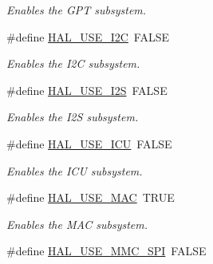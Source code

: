 \begin{DoxyCompactItemize}
\begin{DoxyCompactList}\small\item\em Enables the G\+P\+T subsystem. \end{DoxyCompactList}\item 
\hypertarget{group__HAL__CONF_gae5eb94efa72e401dc17a356b27f4e7e5}{\#define \hyperlink{group__HAL__CONF_gae5eb94efa72e401dc17a356b27f4e7e5}{H\+A\+L\+\_\+\+U\+S\+E\+\_\+\+I2\+C}~F\+A\+L\+S\+E}\label{group__HAL__CONF_gae5eb94efa72e401dc17a356b27f4e7e5}

\begin{DoxyCompactList}\small\item\em Enables the I2\+C subsystem. \end{DoxyCompactList}\item 
\hypertarget{group__HAL__CONF_ga5a92967aad4c273b71d8db15731d50d4}{\#define \hyperlink{group__HAL__CONF_ga5a92967aad4c273b71d8db15731d50d4}{H\+A\+L\+\_\+\+U\+S\+E\+\_\+\+I2\+S}~F\+A\+L\+S\+E}\label{group__HAL__CONF_ga5a92967aad4c273b71d8db15731d50d4}

\begin{DoxyCompactList}\small\item\em Enables the I2\+S subsystem. \end{DoxyCompactList}\item 
\hypertarget{group__HAL__CONF_gac58fde738d018b1233a5441ae4c6245b}{\#define \hyperlink{group__HAL__CONF_gac58fde738d018b1233a5441ae4c6245b}{H\+A\+L\+\_\+\+U\+S\+E\+\_\+\+I\+C\+U}~F\+A\+L\+S\+E}\label{group__HAL__CONF_gac58fde738d018b1233a5441ae4c6245b}

\begin{DoxyCompactList}\small\item\em Enables the I\+C\+U subsystem. \end{DoxyCompactList}\item 
\hypertarget{group__HAL__CONF_ga0da24d012c72a79db22e5621b391d3da}{\#define \hyperlink{group__HAL__CONF_ga0da24d012c72a79db22e5621b391d3da}{H\+A\+L\+\_\+\+U\+S\+E\+\_\+\+M\+A\+C}~T\+R\+U\+E}\label{group__HAL__CONF_ga0da24d012c72a79db22e5621b391d3da}

\begin{DoxyCompactList}\small\item\em Enables the M\+A\+C subsystem. \end{DoxyCompactList}\item 
\hypertarget{group__HAL__CONF_gafc4461ac2cc33590839ed91f2e940079}{\#define \hyperlink{group__HAL__CONF_gafc4461ac2cc33590839ed91f2e940079}{H\+A\+L\+\_\+\+U\+S\+E\+\_\+\+M\+M\+C\+\_\+\+S\+P\+I}~F\+A\+L\+S\+E}\label{group__HAL__CONF_gafc4461ac2cc33590839ed91f2e940079}


\end{DoxyCompactItemize}

